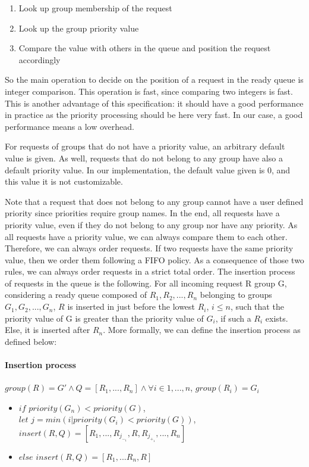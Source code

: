 \documentclass[11pt]{report}
\begin{document}
\begin{enumerate}
\item Look up group membership of the request
\item Look up the group priority value
\item Compare the value with others in the queue and position the request accordingly
\end{enumerate}

So the main operation to decide on the position of a request in the ready queue is integer comparison. This operation is fast, since comparing two integers is fast. This is another advantage of this specification: it should have a good performance in practice as the priority processing should be here very fast. In our case, a good performance means a low overhead.

For requests of groups that do not have a priority value, an arbitrary default value is given. As well, requests that do not belong to any group have also a default priority value. In our implementation, the default value given is 0, and this value it is not customizable. 

Note that a request that does not belong to any group cannot have a user defined priority since priorities require group names. In the end, all requests have a priority value, even if they do not belong to any group nor have any priority. As all requests have a priority value, we can always compare them to each other. Therefore, we can always order requests. If two requests have the same priority value, then we order them following a FIFO policy. As a consequence of those two rules, we can always order requests in a strict total order.
The insertion process of requests in the queue is the following. For all incoming request R group G, considering a ready queue composed of $R_1,R_2,...,R_n$ belonging to groups $G_1,G_2,...,G_n$, $R$ is  inserted in just before the lowest $R_i$, $i \le n$, such that the priority value of G is greater than the priority value of $G_i$, if such a $R_i$ exists. Else, it is inserted after $R_n$.
More formally, we can define the insertion process as defined below:
\paragraph{Insertion process}
$group(R)=G' \wedge Q=[R_1,...,R_n] \wedge \forall i \in 1,...,n$, $group(R_i)=G_i$
\begin{itemize}
\item $if$ $priority(G_n) < priority(G)$,\\$let$ $j=min({i| priority(G_i) < priority(G)})$, $insert(R, Q)=[R_1,...,R_j_-_1,R,R_j_+_1,...,R_n]$
\item $else$ $insert(R,Q)=[R_1,...R_n,R]$
\end{itemize}
\end{document}
